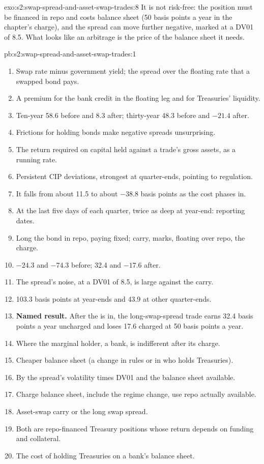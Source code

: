 \begin{solution}{exo:s2:swap-spread-and-asset-swap-trades:8}
It is not risk-free: the position must be financed in repo and costs balance sheet (50 basis points a year in the chapter's charge), and the spread
can move further negative, marked at a DV01 of 8.5. What looks like an arbitrage is the price of the balance sheet it needs.
\end{solution}

\begin{solution}{pb:s2:swap-spread-and-asset-swap-trades:1}
\begin{enumerate}
\item Swap rate minus government yield; the spread over the floating rate that a swapped bond pays.
\item A premium for the bank credit in the floating leg and for Treasuries' liquidity.
\item Ten-year 58.6 before and 8.3 after; thirty-year 48.3 before and $-21.4$ after.
\item Frictions for holding bonds make negative spreads unsurprising.
\item The return required on capital held against a trade's gross assets, as a running rate.
\item Persistent CIP deviations, strongest at quarter-ends, pointing to regulation.
\item It falls from about 11.5 to about $-38.8$ basis points as the cost phases in.
\item At the last five days of each quarter, twice as deep at year-end: reporting dates.
\item Long the bond in repo, paying fixed; carry, marks, floating over repo, the charge.
\item $-24.3$ and $-74.3$ before; 32.4 and $-17.6$ after.
\item The spread's noise, at a DV01 of 8.5, is large against the carry.
\item 103.3 basis points at year-ends and 43.9 at other quarter-ends.
\item \textbf{Named result.} After the  is in, the long-swap-spread trade earns 32.4 basis points a year uncharged and loses 17.6
charged at 50 basis points a year.
\item Where the marginal holder, a bank, is indifferent after its charge.
\item Cheaper balance sheet (a change in rules or in who holds Treasuries).
\item By the spread's volatility times DV01 and the balance sheet available.
\item Charge balance sheet, include the regime change, use repo actually available.
\item Asset-swap carry or the long swap spread.
\item Both are repo-financed Treasury positions whose return depends on funding and collateral.
\item The cost of holding Treasuries on a bank's balance sheet.
\end{enumerate}
\end{solution}

